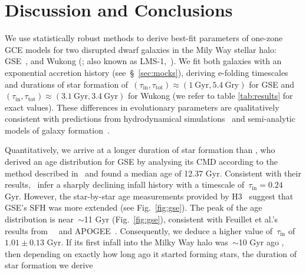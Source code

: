 \documentclass[ms.tex]{subfiles}
\begin{document}
\section{Discussion and Conclusions}
\label{sec:conclusions}

We use statistically robust methods to derive best-fit parameters of
one-zone GCE models for two disrupted dwarf galaxies in the Mily Way stellar
halo: GSE~\citep{Belokurov2018, Helmi2018}, and Wukong (\citealp{Naidu2020,
Naidu2022}; also known as LMS-1,~\citealp{Yuan2020}).
We fit both galaxies with an exponential accretion history
(see~\S~\ref{sec:mocks}), deriving e-folding timescales and durations of star
formation of~$(\tau_\text{in}, \tau_\text{tot}) \approx (1~\text{Gyr},
5.4~\text{Gry})$ for GSE and~$(\tau_\text{in}, \tau_\text{tot}) \approx
(3.1~\text{Gyr}, 3.4~\text{Gyr})$ for Wukong (we refer to table
\ref{tab:results} for exact values).
These differences in evolutionary parameters are qualitatively consistent with
predictions from hydrodynamical simulations~\citep[e.g.,][]{GarrisonKimmel2019}
and semi-analytic models of galaxy formation~\citep[e.g.,][]{Baugh2006,
Somerville2015a, Behroozi2019}.
\par
Quantitatively, we arrive at a longer duration of star formation than
\citet{Gallart2019}, who derived an age distribution for GSE by analysing its
CMD according to the method described in~\citet{Dolphin2002} and found a
median age of 12.37 Gyr.
Consistent with their results,~\citet{Vincenzo2019} infer a sharply declining
infall history with a timescale of~$\tau_\text{in} = 0.24$ Gyr.
However, the star-by-star age measurements provided by H3~\citep{Conroy2019}
suggest that GSE's SFH was more extended (see Fig.~\ref{fig:gse}).
The peak of the age distribution is near~$\sim$11 Gyr (Fig.~\ref{fig:gse}),
consistent with Feuillet et al.'s~\citeyearpar{Feuillet2021} results
from~\gaia~\citep{Gaia2016} and APOGEE~\citep{Majewski2017}.
Consequently, we deduce a higher value of~$\tau_\text{in}$ of~$1.01 \pm 0.13$
Gyr.
If its first infall into the Milky Way halo was~$\sim$10 Gyr ago
\citep[e.g.,][]{Helmi2018, Bonaca2020}, then depending on exactly how long ago
it started forming stars, the duration of star formation we derive
\end{document}
